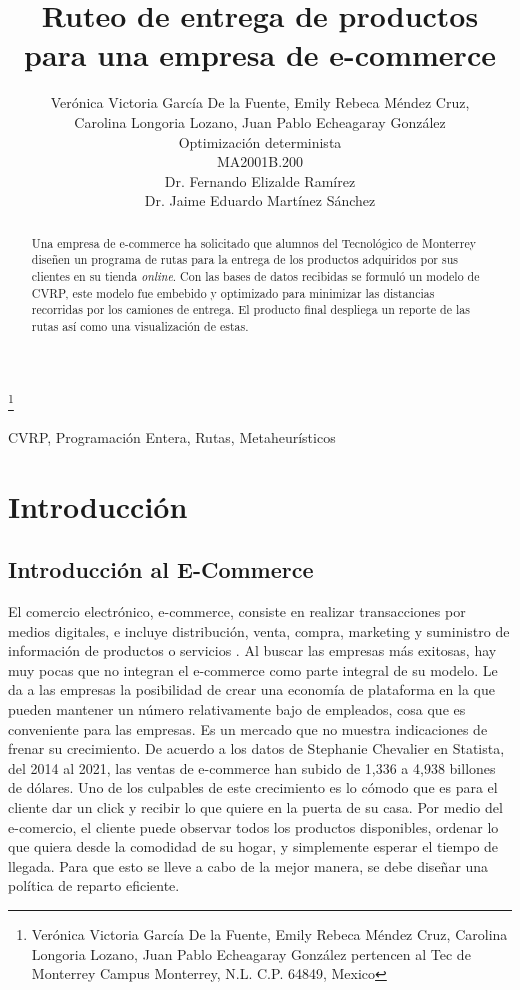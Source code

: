 \documentclass[journal]{IEEEtran}
\title{\LARGE \bf Ruteo de entrega de productos para una empresa de e-commerce}
\author{Verónica Victoria García De la Fuente, Emily Rebeca Méndez Cruz, \\Carolina Longoria Lozano, Juan Pablo Echeagaray González \\
Optimización determinista \\
MA2001B.200 \\
Dr. Fernando Elizalde Ramírez \\
Dr. Jaime Eduardo Martínez Sánchez}%
\begin{document}
    \thanks{Verónica Victoria García De la Fuente, Emily Rebeca Méndez Cruz, Carolina Longoria Lozano, Juan Pablo Echeagaray González pertencen al Tec de Monterrey Campus Monterrey, N.L. C.P. 64849, Mexico {\tt\small}}

    \maketitle

    \thispagestyle{empty}
    \pagestyle{empty}

    \begin{abstract}
        Una empresa de e-commerce ha solicitado que alumnos del Tecnológico de Monterrey diseñen un programa de rutas para la entrega de los productos adquiridos por sus clientes en su tienda \emph{online}. Con las bases de datos recibidas se formuló un modelo de CVRP, este modelo fue embebido y optimizado para minimizar las distancias recorridas por los camiones de entrega. El producto final despliega un reporte de las rutas así como una visualización de estas.
    \end{abstract}

    \begin{IEEEkeywords} 
        CVRP, Programación Entera, Rutas, Metaheurísticos
    \end{IEEEkeywords}

    \section{Introducción} %

        \subsection{Introducción al E-Commerce}
        
            El comercio electrónico, e-commerce, consiste en realizar transacciones por medios digitales, e incluye distribución, venta, compra, marketing y suministro de información de productos o servicios \cite{visand}. Al buscar las empresas más exitosas, hay muy pocas que no integran el e-commerce como parte integral de su modelo. Le da a las empresas la posibilidad de crear una economía de plataforma \cite{dekker-supremacy} en la que pueden mantener un número relativamente bajo de empleados, cosa que es conveniente para las empresas. Es un mercado que no muestra indicaciones de frenar su crecimiento. De acuerdo a los datos de Stephanie Chevalier en Statista, del 2014 al 2021, las ventas de e-commerce han subido de 1,336 a 4,938 billones de dólares. Uno de los culpables de este crecimiento es lo cómodo que es para el cliente dar un click y recibir lo que quiere en la puerta de su casa. Por medio del e-comercio, el cliente puede observar todos los productos disponibles, ordenar lo que quiera desde la comodidad de su hogar, y simplemente esperar el tiempo de llegada. Para que esto se lleve a cabo de la mejor manera, se debe diseñar una política de reparto eficiente.
    
\end{document}
